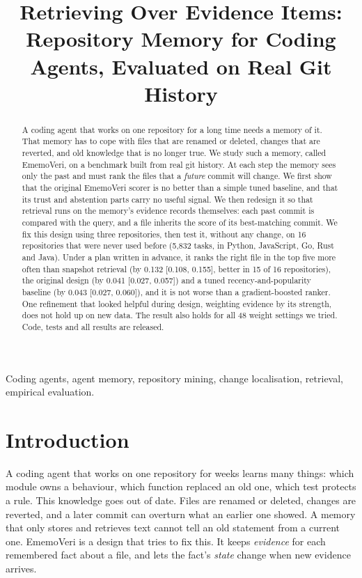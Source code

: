 \documentclass[conference]{IEEEtran}
\newcommand{\sys}{EmemoVeri}
\begin{document}
\title{Retrieving Over Evidence Items: Repository Memory for Coding Agents, Evaluated on Real Git History}
\author{
\and
{}
}
\maketitle
\begin{abstract}
A coding agent that works on one repository for a long time needs a memory of it. That memory has to cope with files that are renamed or deleted, changes that are reverted, and old knowledge that is no longer true. We study such a memory, called \sys{}, on a benchmark built from real git history. At each step the memory sees only the past and must rank the files that a \emph{future} commit will change. We first show that the original \sys{} scorer is no better than a simple tuned baseline, and that its trust and abstention parts carry no useful signal. We then redesign it so that retrieval runs on the memory's evidence records themselves: each past commit is compared with the query, and a file inherits the score of its best-matching commit. We fix this design using three repositories, then test it, without any change, on 16 repositories that were never used before (5{,}832 tasks, in Python, JavaScript, Go, Rust and Java). Under a plan written in advance, it ranks the right file in the top five more often than snapshot retrieval (by 0.132 [0.108, 0.155], better in 15 of 16 repositories), the original design (by 0.041 [0.027, 0.057]) and a tuned recency-and-popularity baseline (by 0.043 [0.027, 0.060]), and it is not worse than a gradient-boosted ranker. One refinement that looked helpful during design, weighting evidence by its strength, does not hold up on new data. The result also holds for all 48 weight settings we tried. Code, tests and all results are released.
\end{abstract}
\begin{IEEEkeywords}
Coding agents, agent memory, repository mining, change localisation, retrieval, empirical evaluation.
\end{IEEEkeywords}

\section{Introduction}
A coding agent that works on one repository for weeks learns many things: which module owns a behaviour, which function replaced an old one, which test protects a rule. This knowledge goes out of date. Files are renamed or deleted, changes are reverted, and a later commit can overturn what an earlier one showed. A memory that only stores and retrieves text cannot tell an old statement from a current one. \sys{} is a design that tries to fix this. It keeps \emph{evidence} for each remembered fact about a file, and lets the fact's \emph{state} change when new evidence arrives.
\end{document}
